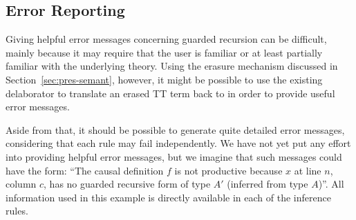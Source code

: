 \subsection{Error Reporting}
\label{sec:error-reporting}
Giving helpful error messages concerning guarded recursion can be difficult,
mainly because it may require that the user is familiar or at least partially
familiar with the underlying theory. Using the erasure mechanism discussed in
Section~\ref{sec:pres-semant}, however, it might be possible to use the existing
delaborator to translate an erased TT term back to \IdrisM{} in order to provide
useful error messages.

Aside from that, it should be possible to
generate quite detailed error messages, considering that each rule may fail
independently. We have not yet put any effort into providing helpful error
messages, but we imagine that such messages could have the form: ``The causal
definition $f$ is not productive because $x$ at line $n$, column $c$, has no
guarded recursive form of type $A'$ (inferred from type $A$)''. All information
used in this example is directly available in each of the inference rules.






